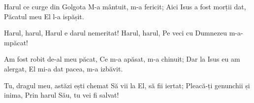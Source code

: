 \beginverse
Harul ce curge din Golgota
M-a mântuit, m-a fericit;
Aici Isus a fost morții dat,
Păcatul meu El l-a ispășit.
\endverse

\beginchorus
Harul, harul,
Harul e darul nemeritat!
Harul, harul,
Pe veci cu Dumnezeu m-a-mpăcat!
\endchorus

\beginverse
Am fost robit de-al meu păcat,
Ce m-a apăsat, m-a chinuit;
Dar la Isus eu am alergat,
El mi-a dat pacea, m-a izbăvit.
\endverse

\beginverse
Tu, dragul meu, astăzi ești chemat
Să vii la El, să fii iertat;
Pleacă-ți genunchii și inima,
Prin harul Său, tu vei fi salvat!
\endverse
\endsong